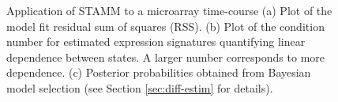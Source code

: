 \begin{figure}[!t]
  \centering
  \caption{Application of STAMM to a microarray time-course (a) Plot of the model fit residual sum of squares (RSS). (b) Plot of the condition number for estimated expression signatures quantifying linear dependence between states. A larger number corresponds to more dependence. (c) Posterior probabilities obtained from Bayesian model selection (see Section \ref{sec:diff-estim} for details).}
  \label{fig:model-fit-repro}
\end{figure}

